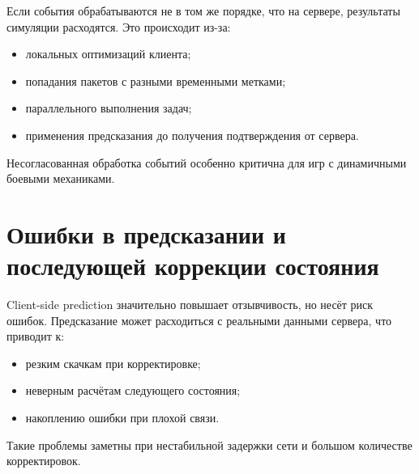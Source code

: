 Если события обрабатываются не в том же порядке, что на сервере, результаты симуляции расходятся.
Это происходит из-за:

\begin{itemize}
    \item локальных оптимизаций клиента;
    \item попадания пакетов с разными временными метками;
    \item параллельного выполнения задач;
    \item применения предсказания до получения подтверждения от сервера.
\end{itemize}

Несогласованная обработка событий особенно критична для игр с динамичными боевыми механиками.

\section{Ошибки в предсказании и последующей коррекции состояния}

Client-side prediction значительно повышает отзывчивость, но несёт риск ошибок.
Предсказание может расходиться с реальными данными сервера, что приводит к:

\begin{itemize}
    \item резким скачкам при корректировке\cite{gamenetpatterns};
    \item неверным расчётам следующего состояния;
    \item накоплению ошибки при плохой связи.
\end{itemize}

Такие проблемы заметны при нестабильной задержки сети и большом количестве корректировок.

